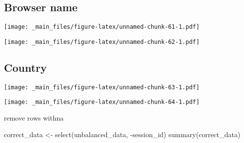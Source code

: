 \documentclass[
]{book}
\newenvironment{Shaded}{\begin{snugshade}}{\end{snugshade}}
\newcommand{\FunctionTok}[1]{\textcolor[rgb]{0.00,0.00,0.00}{#1}}
\newcommand{\NormalTok}[1]{#1}
\newcommand{\OtherTok}[1]{\textcolor[rgb]{0.56,0.35,0.01}{#1}}
\newcommand{\SpecialCharTok}[1]{\textcolor[rgb]{0.00,0.00,0.00}{#1}}
\begin{document}
\hypertarget{browser-name}{%
\subsection{Browser name}\label{browser-name}}

\begin{Shaded}
\end{Shaded}

\texttt{[image: \_main\_files/figure-latex/unnamed-chunk-61-1.pdf]}

\begin{Shaded}
\end{Shaded}

\texttt{[image: \_main\_files/figure-latex/unnamed-chunk-62-1.pdf]}

\hypertarget{country}{%
\subsection{Country}\label{country}}

\begin{Shaded}
\end{Shaded}

\texttt{[image: \_main\_files/figure-latex/unnamed-chunk-63-1.pdf]}

\begin{Shaded}
\end{Shaded}

\texttt{[image: \_main\_files/figure-latex/unnamed-chunk-64-1.pdf]}

remove rows withna

\begin{Shaded}
\begin{Highlighting}[]
\NormalTok{correct\_data }\OtherTok{\textless{}{-}} \FunctionTok{select}\NormalTok{(unbalanced\_data, }\SpecialCharTok{{-}}\NormalTok{session\_id)}
\FunctionTok{summary}\NormalTok{(correct\_data)}
\end{Highlighting}
\end{Shaded}
\end{document}
